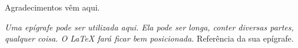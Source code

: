 \begin{agradecimentos}
Agradecimentos vêm aqui.

\end{agradecimentos}


\cleardoublepage
\newpage

\phantom{11}
\vfill\vfill\vfill
\begin{flushright}
  \begin{minipage}{0.7\textwidth}
    \emph{Uma epígrafe pode ser utilizada aqui. Ela pode ser longa, conter diversas partes, qualquer coisa. O LaTeX fará ficar bem posicionada.}
    \newline
    \newline
    \scriptsize{Referência da sua epígrafe.}
  \end{minipage}
\end{flushright}